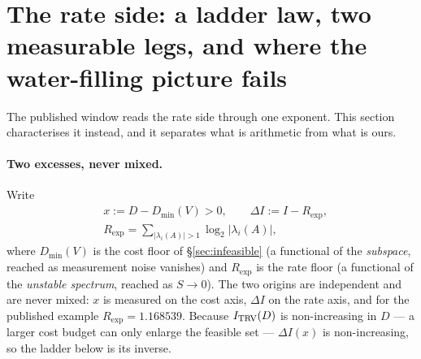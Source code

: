 \section{The rate side: a ladder law, two measurable legs, and where the water-filling picture fails}\label{sec:rate}

The published window reads the rate side through one exponent. This section
characterises it instead, and it separates what is arithmetic from what is ours.

\paragraph{Two excesses, never mixed.} Write
\begin{equation}
  \begin{aligned}
  &x:=D-D_{\min}(V)>0,\qquad \Delta I:=I-R_{\exp},\\
  &R_{\exp}=\sum_{|\lambda_i(A)|>1}\log_2|\lambda_i(A)|,
  \end{aligned}
  \label{eq:excess}
\end{equation}
where $D_{\min}(V)$ is the cost floor of \S\ref{sec:infeasible} (a functional of
the \emph{subspace}, reached as measurement noise vanishes) and $R_{\exp}$ is the
rate floor (a functional of the \emph{unstable spectrum}, reached as $S\to0$).
The two origins are independent and are never mixed: $x$ is measured on the cost
axis, $\Delta I$ on the rate axis, and for the published example
$R_{\exp}=1.168539$. Because $I_{\rm TRV}(D)$ is non-increasing in $D$ --- a larger
cost budget can only enlarge the feasible set --- $\Delta I(x)$ is non-increasing,
so the ladder below is its inverse.

